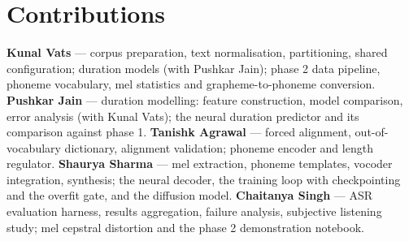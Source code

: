 \documentclass[conference]{IEEEtran}
\begin{document}
\section*{Contributions}

\textbf{Kunal Vats} --- corpus preparation, text normalisation, partitioning, shared
configuration; duration models (with Pushkar Jain); phase 2 data pipeline, phoneme vocabulary,
mel statistics and grapheme-to-phoneme conversion.
\textbf{Pushkar Jain} --- duration modelling: feature construction, model comparison, error
analysis (with Kunal Vats); the neural duration predictor and its comparison against phase 1.
\textbf{Tanishk Agrawal} --- forced alignment, out-of-vocabulary dictionary, alignment
validation; phoneme encoder and length regulator.
\textbf{Shaurya Sharma} --- mel extraction, phoneme templates, vocoder integration, synthesis;
the neural decoder, the training loop with checkpointing and the overfit gate, and the diffusion
model.
\textbf{Chaitanya Singh} --- ASR evaluation harness, results aggregation, failure analysis,
subjective listening study; mel cepstral distortion and the phase 2 demonstration notebook.

\balance


\end{document}
